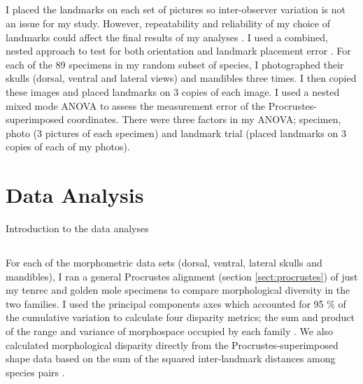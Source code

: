 \subsection{}

	I placed the landmarks on each set of pictures so inter-observer variation is not an issue for my study.  However, repeatability and reliability of my choice of landmarks could affect the final results of my analyses \citep{Arnqvist1998}.
	I used a combined, nested approach to test for both orientation and landmark placement error \citep{Arnqvist1998, Barrow2008}. For each of the 89 specimens in my random subset of species, I photographed their skulls (dorsal, ventral and lateral views) and mandibles three times. I then copied these images and placed landmarks on 3 copies of each image. I used a nested mixed mode ANOVA to assess the measurement error of the Procrustes-superimposed coordinates. There were three factors in my ANOVA; specimen, photo (3 pictures of each specimen) and landmark trial (placed landmarks on 3 copies of each of my photos).



\section{Data Analysis}
\label{sect:data_analysis}

Introduction to the data analyses

\subsection{}

	For each of the morphometric data sets (dorsal, ventral, lateral skulls and mandibles), I ran a general Procrustes alignment (section \ref{sect:procrustes}) of just my tenrec and golden mole specimens to compare morphological diversity in the two families. I used the principal components axes which accounted for 95 \% of the cumulative variation to calculate four disparity metrics; the sum and product of the range and variance of morphospace occupied by each family \citep{Brusatte2008, Foth2012, Ruta2013}. We also calculated morphological disparity directly from the Procrustes-superimposed shape data based on the sum of the squared inter-landmark distances among species pairs \citep[SSqDist,][]{Zelditch2012}.
	
